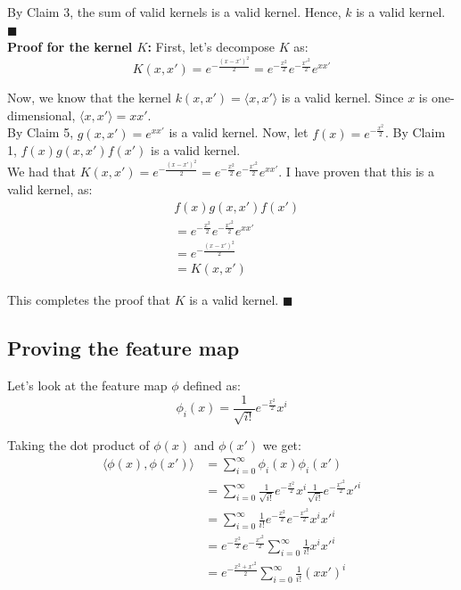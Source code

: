 \documentclass[a4paper]{article}
\begin{document}
By Claim 3, the sum of valid kernels is a valid kernel. Hence, $k$ is a valid kernel. $\blacksquare$\\

\textbf{Proof for the kernel $K$:} First, let's decompose $K$ as:
\begin{equation*}
    K(x, x') = e^{-\frac{(x-x')^2}{2}} = e^{-\frac{x^2}{2}} e^{-\frac{x'^2}{2}} e^{xx'}
\end{equation*}

Now, we know that the kernel $k(x, x') = \langle x, x' \rangle$ is a valid kernel. Since $x$ is one-dimensional, $\langle x, x' \rangle = xx'$.\\

By Claim 5, $g(x, x') = e^{xx'}$ is a valid kernel. Now, let $f(x) = e^{-\frac{x^2}{2}}$. By Claim 1, $f(x)g(x, x')f(x')$ is a valid kernel.\\

We had that $K(x, x') = e^{-\frac{(x-x')^2}{2}} = e^{-\frac{x^2}{2}} e^{-\frac{x'^2}{2}} e^{xx'}$. I have proven that this is a valid kernel, as:
\begin{align*}
    &f(x)g(x, x')f(x')\\
    &= e^{-\frac{x^2}{2}} e^{-\frac{x'^2}{2}} e^{xx'}\\
    &= e^{-\frac{(x-x')^2}{2}}\\
    &= K(x, x')
\end{align*}

This completes the proof that $K$ is a valid kernel. $\blacksquare$\\

\newpage

\subsection{Proving the feature map}

Let's look at the feature map $\phi$ defined as:
\begin{equation*}
    \phi_i(x) = \frac{1}{\sqrt{i!}}e^{-\frac{x^2}{2}} x^i
\end{equation*}

Taking the dot product of $\phi(x)$ and $\phi(x')$ we get:
\begin{align*}
    \langle \phi(x), \phi(x') \rangle &= \sum_{i=0}^{\infty} \phi_i(x) \phi_i(x') \\
    &= \sum_{i=0}^{\infty} \frac{1}{\sqrt{i!}}e^{-\frac{x^2}{2}} x^i \frac{1}{\sqrt{i!}}e^{-\frac{x'^2}{2}} x'^i \\
    &= \sum_{i=0}^{\infty} \frac{1}{i!}e^{-\frac{x^2}{2}} e^{-\frac{x'^2}{2}} x^i x'^i \\
    &= e^{-\frac{x^2}{2}} e^{-\frac{x'^2}{2}} \sum_{i=0}^{\infty} \frac{1}{i!} x^i x'^i\\
    &= e^{-\frac{x^2 + x'^2}{2}}\sum_{i=0}^{\infty} \frac{1}{i!} (xx')^i
\end{align*}
\end{document}
